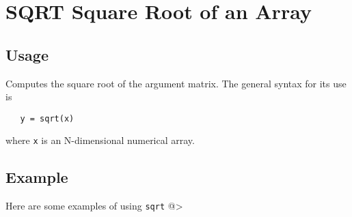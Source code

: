 \section{SQRT Square Root of an Array}

\subsection{Usage}

Computes the square root of the argument matrix.  The general
syntax for its use is
\begin{verbatim}
   y = sqrt(x)
\end{verbatim}
where \verb|x| is an N-dimensional numerical array.
\subsection{Example}

Here are some examples of using \verb|sqrt|
@>
